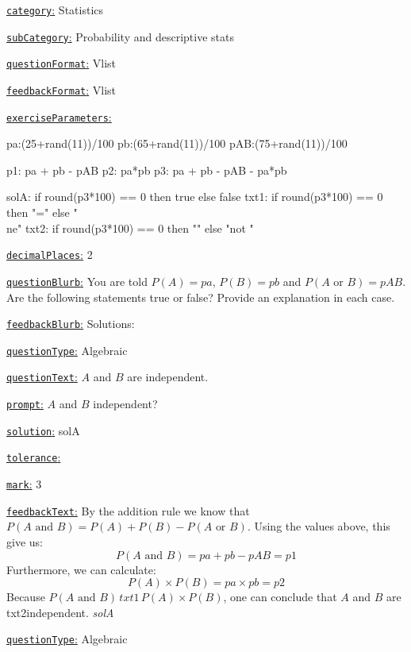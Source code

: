 \documentclass[preview]{standalone}
\newcommand \fieldname[1]{\underline{\texttt{#1}:}}
\begin{document}
\fieldname{category}  %
Statistics

\fieldname{subCategory} %
Probability and descriptive stats

\fieldname{questionFormat}
Vlist

\fieldname{feedbackFormat}
Vlist

\fieldname{exerciseParameters}

pa:(25+rand(11))/100
pb:(65+rand(11))/100
pAB:(75+rand(11))/100

p1: pa + pb - pAB
p2: pa*pb
p3: pa + pb - pAB - pa*pb

solA: if round(p3*100) == 0 then true else false
txt1: if round(p3*100) == 0 then "=" else "\\ne"
txt2: if round(p3*100) == 0 then "" else "not "

\fieldname{decimalPlaces}
2

\fieldname{questionBlurb}
You are told $P(A) = {pa}$, $P(B) = {pb}$ and $P(A \textrm{ or } B) = {pAB}$. Are the following statements true or false? Provide an explanation in each case.

\fieldname{feedbackBlurb}
Solutions:

\fieldname{questionType}
Algebraic

\fieldname{questionText}
$A$ and $B$ are independent.

\fieldname{prompt}
$A$ and $B$ independent?

\fieldname{solution}
solA

\fieldname{tolerance}


\fieldname{mark}
3

\fieldname{feedbackText}
By the addition rule we know that $P(A \textrm{ and } B) = P(A) + P(B) - P(A \textrm{ or } B)$. Using the values above, this give us:
\[
P(A \textrm{ and } B) = {pa} + {pb} - {pAB} = {p1}
\]
Furthermore, we can calculate:
\[
P(A)\times P(B) = {pa} \times {pb} = {p2}
\]
Because $P(A \textrm{ and } B) \, {txt1} \, P(A)\times P(B)$, one can conclude that $A$ and $B$ are {txt2}independent. \emph{{solA}}

\fieldname{questionType}
Algebraic
\end{document}
